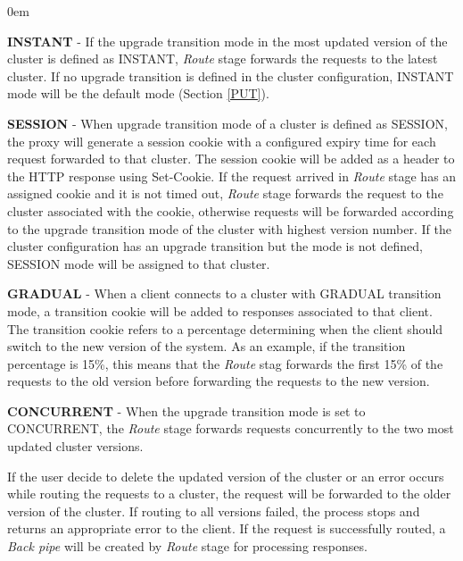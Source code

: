 \documentclass[a4paper,11pt,twoside]{article}
\begin{document}
\begin{list}{-}{}
  \itemsep0em
  \item{\textbf{INSTANT}} - If the upgrade transition mode in the most updated version of the cluster is defined as INSTANT, \textit{Route} stage forwards the requests to the latest cluster. If no upgrade transition is defined in the cluster configuration, INSTANT mode will be the default mode (Section \ref{PUT}).\\
  
  \item{\textbf{SESSION}} -  When upgrade transition mode of a cluster is defined as SESSION, the proxy will generate a  session cookie with a configured expiry time for each request forwarded to that cluster. The session cookie will be added as a header to the HTTP response using  Set-Cookie. If the request arrived in \textit{Route} stage has an assigned cookie and it is not timed out, \textit{Route} stage forwards the request to the cluster associated with the cookie, otherwise requests will be forwarded according to the upgrade transition mode of the cluster with highest version number. If the cluster configuration has an upgrade transition but the mode is not defined, SESSION mode will be assigned to that cluster. \\
  
   \item{\textbf{GRADUAL}} - When a client connects to a cluster with GRADUAL transition mode, a transition cookie will be added to responses associated to that client. The transition cookie refers to a percentage determining when the client should switch to the new version of the system. As an example, if the transition percentage is 15\%, this means that the \textit{Route} stag forwards the first 15\% of the requests to the old version before forwarding the requests to the new version.\\
   
   \item{\textbf{CONCURRENT}} - When the upgrade transition mode is set to CONCURRENT, the \textit{Route} stage forwards requests concurrently to the two most updated cluster versions.        
\end{list}
\noindent
If the user decide to delete the updated version of the cluster or an error occurs while routing the requests to a cluster, the request will be forwarded to the older version of the cluster. If routing to all versions failed, the process stops and returns an appropriate error to the client. If the request is successfully routed, a \textit{Back pipe} will be created by \textit{Route} stage for processing responses.   
\end{document}
